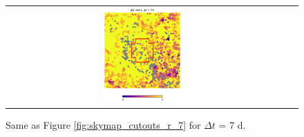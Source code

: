 \documentclass[preprintm,linenumbers]{aastex631}
\begin{document}
\begin{figure}
\begin{tabular}{  c c c}
				\includegraphics[width=0.3\textwidth]{results/skymaps_cutout/skymaps_cutout_delta_first_year_one_snap_v4_0_10yrs_db_noDD_noTwi_tscale-7_nside-256_doAllTemplateMetrics_reduceCount_r_GP_noDD_noTwi.pdf} \\
			\end{tabular}
			\caption{
				 Same as Figure \ref{fig:skymap_cutouts_r_7} for $\Delta t$ = 7 d.  
			}
   \label{fig:_skymap_cutouts_r_7}
		\end{figure}
        
\end{document}
